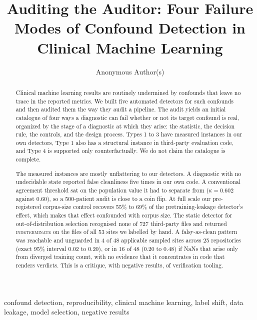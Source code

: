 \documentclass[pmlr,twocolumn,10pt]{jmlr}
\title[Auditing the Auditor]{Auditing the Auditor: Four Failure Modes of
Confound Detection in Clinical Machine Learning}
\author{Anonymous Author(s)}
\begin{document}
\maketitle

\ifmlhdemo\else
\begin{abstract}
Clinical machine learning results are routinely undermined by confounds that
leave no trace in the reported metrics. We built five automated detectors for
such confounds and then audited them the way they audit a pipeline. The audit
yields an initial catalogue of four ways a diagnostic can fail whether or not
its target confound is real, organized by the stage of a diagnostic at which
they arise: the statistic, the decision rule, the controls, and the design
process. Types 1 to 3 have measured instances in our own detectors, Type 1 also
has a structural instance in third-party evaluation code, and Type 4 is
supported only counterfactually. We do not claim the catalogue is complete.

The measured instances are mostly unflattering to our detectors. A diagnostic
with no undecidable state reported false cleanliness five times in our own code.
A conventional agreement threshold sat on the population value it had to
separate from ($\kappa=0.602$ against $0.60$), so a 500-patient audit is close
to a coin flip. At full scale our pre-registered corpus-size control recovers
55\% to 69\% of the pretraining-leakage detector's effect, which makes that
effect confounded with corpus size. The static detector for out-of-distribution
selection recognised none of 727 third-party files and returned
\textsc{indeterminate} on the files of all 53 sites we labelled by hand. A
falsy-as-clean pattern was reachable and unguarded in 4 of 48 applicable
sampled sites across 25 repositories (exact 95\% interval 0.02 to 0.20), or in
16 of 48 (0.20 to 0.48) if NaNs that arise only from diverged training count,
with no evidence that it concentrates in code that renders verdicts. This is a
critique, with negative results, of verification tooling.
\end{abstract}
\begin{keywords}
confound detection, reproducibility, clinical machine learning, label shift,
data leakage, model selection, negative results
\end{keywords}
\fi

\ifmlhneedsstatements
\end{document}
